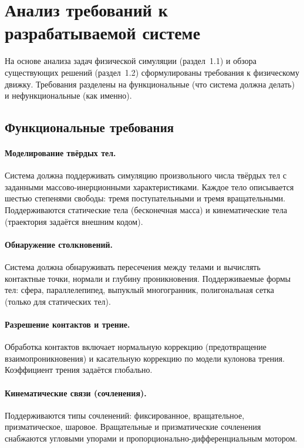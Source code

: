 \section{Анализ требований к разрабатываемой системе}

На основе анализа задач физической симуляции (раздел~1.1) и обзора существующих решений (раздел~1.2) 
сформулированы требования к физическому движку. Требования разделены на функциональные (что система должна 
делать) и нефункциональные (как именно).

\subsection{Функциональные требования}

\paragraph{Моделирование твёрдых тел.} Система должна поддерживать симуляцию произвольного числа твёрдых тел с 
заданными массово-инерционными характеристиками. Каждое тело описывается шестью степенями свободы: тремя 
поступательными и тремя вращательными. Поддерживаются статические тела (бесконечная масса) и кинематические 
тела (траектория задаётся внешним кодом).

\paragraph{Обнаружение столкновений.} Система должна обнаруживать пересечения между телами и вычислять 
контактные точки, нормали и глубину проникновения. Поддерживаемые формы тел: сфера, параллелепипед, выпуклый 
многогранник, полигональная сетка (только для статических тел).

\paragraph{Разрешение контактов и трение.} Обработка контактов включает нормальную коррекцию (предотвращение 
взаимопроникновения) и касательную коррекцию по модели кулонова трения. Коэффициент трения задаётся глобально.

\paragraph{Кинематические связи (сочленения).} Поддерживаются типы сочленений: фиксированное, вращательное, 
призматическое, шаровое. Вращательные и призматические сочленения снабжаются угловыми упорами и 
пропорционально-дифференциальным мотором.

